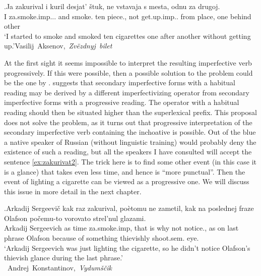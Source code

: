 \exg.\label{ex:zakurivat1}Ja zakurival i kuril desjat' \v{s}tuk, ne vstavaja s mesta, odnu za drugoj.\\
I za.smoke.imp... and smoke. ten piece., not get.up.imp.. from place, one behind other\\
\trans `I started to smoke and smoked ten cigarettes one after another without getting up.'\hbox{}\hfill\hbox{Vasilij Aksenov, \textit{Zv\"{e}zdnyj bilet}}

At the first sight it seems impossible to interpret the resulting imperfective verb progressively. If this were possible, then a possible solution to the problem could be the one by \citet{Ramchand:04}. \citet{Ramchand:04} suggests that secondary imperfective forms with a habitual reading may be derived by a different imperfectivizing operator from secondary imperfective forms with a progressive reading. The operator with a habitual reading should then be situated higher than the superlexical prefix. This proposal does not solve the problem, as it turns out that progressive interpretation of the secondary imperfective verb containing the inchoative  is possible. Out of the blue a native speaker of Russian (without linguistic training) would probably deny the existence of such a reading, but all the speakers I have consulted will accept the sentence \ref{ex:zakurivat2}. The trick here is to find some other event (in this case it is a glance) that takes even less time, and hence is ``more punctual''. Then the event of lighting a cigarette can be viewed as a progressive one. We will discuss this issue in more detail in the next chapter.

\exg.\label{ex:zakurivat2}Arkadij Sergeevi\v{c} kak raz zakurival, po\`{e}tomu ne zametil, kak na poslednej fraze Olafson po\v{c}emu-to vorovato strel'nul glazami.\\
Arkadij Sergeevich as time za.smoke.imp, {that is why} not notice., as on last phrase Olafson {because of something} thievishly shoot.sem. eye.\\
\trans `Arkadij Sergeevich was just lighting the cigarette, so he didn't notice Olafson's thievish glance during the last phrase.'\\\hbox{}\hfill\hbox{
Andrej Konstantinov, \textit{Vydum\v{s}\v{c}ik}}

